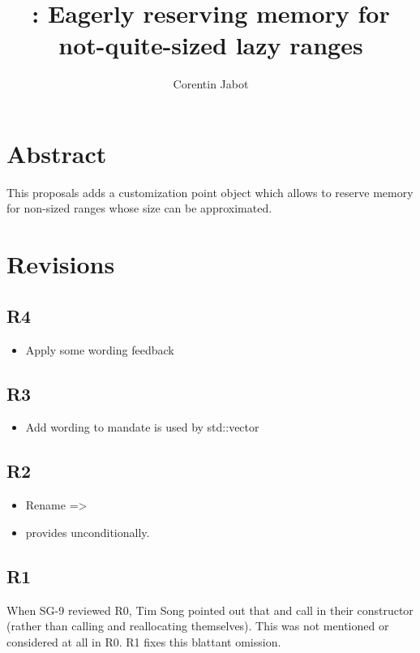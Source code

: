 \documentclass{wg21}
\title{\tcode{reserve\_hint}: Eagerly reserving memory for not-quite-sized lazy ranges}
\author{Corentin Jabot}{corentin.jabot@gmail.com}
\begin{document}
\maketitle

\section{Abstract}

This proposals adds a  customization point object which allows  to
reserve memory for non-sized ranges whose size can be approximated.

\section{Revisions}

\subsection{R4}

\begin{itemize}
\item Apply some wording feedback
\end{itemize}


\subsection{R3}

\begin{itemize}
\item Add wording to mandate  is used by std::vector
\end{itemize}

\subsection{R2}

\begin{itemize}
\item Rename  => 
\item {} provides  unconditionally.
\end{itemize}

\subsection{R1}

When SG-9 reviewed R0, Tim Song pointed out that  and  call  in their constructor (rather than calling  and reallocating themselves).
This was not mentioned or considered at all in R0. R1 fixes this blattant omission.
\end{document}
